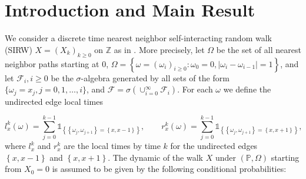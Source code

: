 \documentclass[EJP]{ejpecp} %
\begin{document}


\section{Introduction and Main Result}



We consider a discrete time nearest neighbor self-interacting random walk (SIRW) $X = (X_k)_{k\geq 0}$ on $\mathbb{Z}$ as in \cite{T96,KMP23}. More precisely, let $\Omega$ be the set of all nearest neighbor paths starting at 0, $\Omega = \left\{\omega = (\omega_i)_{i \geq 0}: \omega_0 = 0, |\omega_i - \omega_{i - 1}| = 1 \right\}$, and let $\mathcal{F}_i, i \ge 0$ be the $\sigma$-algebra generated by all sets of the form $\{\omega_j = x_j, j = 0, 1, \ldots, i\} $, and $\mathcal{F} = \sigma\left( \cup_{i = 0}^\infty   \mathcal{F}_i\right)$. For each $\omega$ we define the undirected edge local times

\[ 
l_x^k(\omega) = \sum_{j=0}^{k-1} \mathbb{1}_{ \left\{  \left\{\omega_j, \omega_{j+1}\right\} =  \left\{x,x-1\right\} \right\} }, \qquad
r_x^k(\omega) = \sum_{j=0}^{k-1} \mathbb{1}_{ \left\{  \left\{\omega_j, \omega_{j+1}\right\} =  \left\{x,x+1\right\} \right\} }   
,\]
where $l_x^k$ and $r_x^k$ are the local times by time $k$ for the undirected edges $\left\{x,x-1\right\}$ and $\left\{x,x+1\right\}$.
The dynamic of the walk $X$ under $(\mathbb{P}, \Omega)$ starting from $X_0 = 0$ is assumed to be given by the following conditional probabilities:
\end{document}

